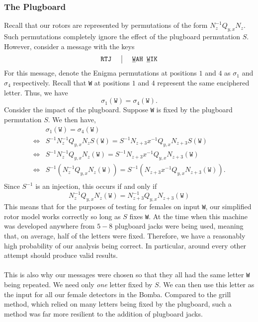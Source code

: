 \subsubsection{The Plugboard}
Recall that our rotors are represented by permutations of the form
$N_{z}^{-1}Q_{y,x}N_{z}$. Such permutations completely ignore the
effect of the plugboard permutation $S$. However, consider a message
with the keys
\[
  \setlength{\arraycolsep}{15pt}
  \begin{array}{c | c}
    \texttt{RTJ} & {\uline{\texttt{W}}}\texttt{AH
    }{\uline{\texttt{W}}}\texttt{IK}              \\
  \end{array}
\]
For this message, denote the Enigma permutations at positions $1$ and
$4$ as $\sigma_1$ and $\sigma_4$ respectively. Recall that \texttt{W}
at positions $1$ and $4$ represent the same enciphered letter. Thus, we have
\[
  \sigma_1(\texttt{W}) = \sigma_4(\texttt{W}).
\]
Consider the impact of the plugboard. Suppose \texttt{W} is fixed by
the plugboard permutation $S$. We then have,
\begin{align*}
  & \sigma_1(\texttt{W}) = \sigma_4(\texttt{W})
  \\
  \iff & S^{-1}N_z^{-1}Q_{y,x}N_zS(\texttt{W}) =
  S^{-1}N_{z+3}x^{-1}Q_{y,x}N_{z+3}S(\texttt{W})     \\
  \iff & S^{-1}N_z^{-1}Q_{y,x}N_z(\texttt{W}) =
  S^{-1}N_{z+3}x^{-1}Q_{y,x}N_{z+3}(\texttt{W})      \\
  \iff & S^{-1}(N_z^{-1}Q_{y,x}N_z(\texttt{W})) =
  S^{-1}(N_{z+3}x^{-1}Q_{y,x}N_{z+3}(\texttt{W})).    \\
\end{align*}
Since $S^{-1}$ is an injection, this occurs if and only if
\[
  N_z^{-1}Q_{y,x}N_z(\texttt{W}) = N_{z+3}^{-1}Q_{y,x}N_{z+3}(\texttt{W})
\]
This means that for the purposes of testing for females on input
\texttt{W}, our simplified rotor model works correctly so long as $S$
fixes \texttt{W}. At the time when this machine was developed
anywhere from $5-8$ plugboard jacks were being used, meaning that, on
average, half of the letters were fixed. Therefore, we have a
reasonably high probability of our analysis being correct. In
particular, around every other attempt should produce valid results.
\\\\This is also why our messages were chosen so that
they all had the same letter \texttt{W} being repeated. We need only
\emph{one} letter fixed by $S$. We can then use this letter as the
input for all our female detectors in the Bomba. Compared to the
grill method, which relied on many letters being fixed by the
plugboard, such a method was far more resilient to the addition of
plugboard jacks.

